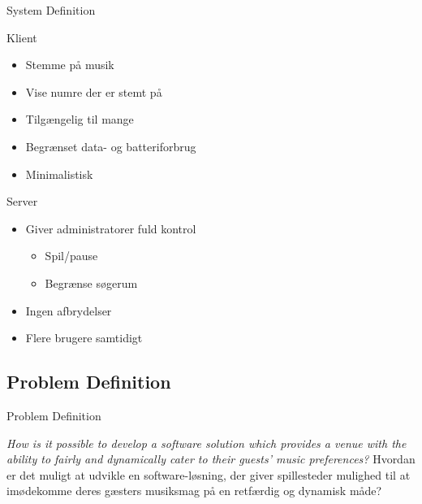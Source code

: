 \begin{frame}{System Definition}
\begin{multicols}{2}
	Klient
	\begin{itemize}
		\item Stemme på musik
		\item Vise numre der er stemt på
		\item Tilgængelig til mange
		\item Begrænset data- og batteriforbrug
		\item Minimalistisk
	\end{itemize}
	
\columnbreak
	
	Server
	\begin{itemize}
		\item Giver administratorer fuld kontrol
		\begin{itemize}
			\item Spil/pause
			\item Begrænse søgerum
		\end{itemize}
		\item Ingen afbrydelser
		\item Flere brugere samtidigt
	\end{itemize}
\end{multicols}
\end{frame}


\subsection{Problem Definition}
\begin{frame}{Problem Definition}
	\begin{center}
		\textit{How is it possible to develop a software solution which provides a venue with the ability to fairly and dynamically cater to their guests' music preferences?}\linebreak\newline
		Hvordan er det muligt at udvikle en software-løsning, der giver spillesteder mulighed til at imødekomme deres gæsters musiksmag på en retfærdig og dynamisk måde?
	\end{center}
\end{frame}